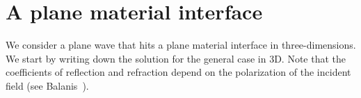 \documentclass[11pt]{article}
\begin{document}

\clearpage
\section{A plane material interface}\label{sec:planeMaterialInterface}

We consider a plane wave that hits a plane material interface in three-dimensions.
We start by writing down the solution for the general case in 3D. 
Note that the coefficients of reflection and refraction depend on the polarization of
the incident field (see Balanis~\cite{Balanis89}).
\end{document}
